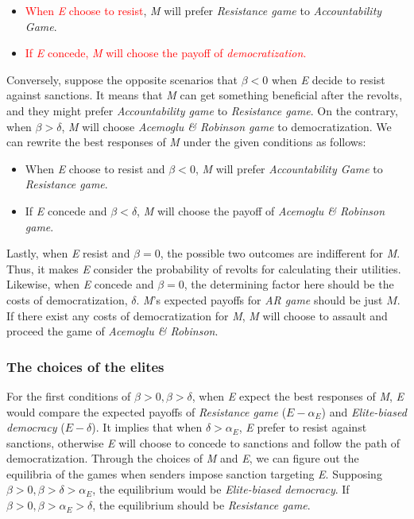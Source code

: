 \documentclass[11pt, letterpage]{article}
\begin{document}
\begin{itemize}
	\item \textcolor{red}{When \textit{E} choose to resist}, \textit{M} will prefer \textit{Resistance game} to \textit{Accountability Game}.
	\item \textcolor{red}{If \textit{E} concede, \textit{M} will choose the payoff of \textit{democratization}.}
\end{itemize}
	
Conversely, suppose the opposite scenarios that $\beta < 0$ when \textit{E} decide to resist against sanctions. It means that \textit{M} can get something beneficial after the revolts, and they might prefer \textit{Accountability game} to \textit{Resistance game}. On the contrary, when $\beta > \delta$, \textit{M} will choose \textit{Acemoglu \& Robinson game} to democratization. We can rewrite the best responses of \textit{M} under the given conditions as follows:

\begin{itemize}
	\item When \textit{E} choose to resist and $\beta < 0$, \textit{M} will prefer \textit{Accountability Game} to \textit{Resistance game}.
	\item If \textit{E} concede and $\beta < \delta$, \textit{M} will choose the payoff of \textit{Acemoglu \& Robinson game}.
\end{itemize}
	
Lastly, when \textit{E} resist and $\beta = 0$, the possible two outcomes are indifferent for \textit{M}. Thus, it makes \textit{E} consider the probability of revolts for calculating their utilities. Likewise, when \textit{E} concede and $\beta = 0$, the determining factor here should be the costs of democratization, $\delta$. \textit{M}'s expected payoffs for \textit{AR game} should be just $M$. If there exist any costs of democratization for \textit{M}, \textit{M} will choose to assault and proceed the game of \textit{Acemoglu \& Robinson}. 
	
\subsubsection*{The choices of the elites}
	
For the first conditions of $\beta > 0, \beta > \delta$, when \textit{E} expect the best responses of \textit{M}, \textit{E} would compare the expected payoffs of \textit{Resistance game} ($E-\alpha_{E}$) and \textit{Elite-biased democracy} ($E-\delta$). It implies that when $\delta > \alpha_{E}$, \textit{E} prefer to resist against sanctions, otherwise \textit{E} will choose to concede to sanctions and follow the path of democratization. Through the choices of \textit{M} and \textit{E}, we can figure out the equilibria of the games when senders impose sanction targeting \textit{E}. Supposing $\beta > 0, \beta > \delta > \alpha_{E}$, the equilibrium would be \textit{Elite-biased democracy}. If $\beta > 0, \beta > \alpha_{E} > \delta$, the equilibrium should be \textit{Resistance game}.
	
\end{document}
